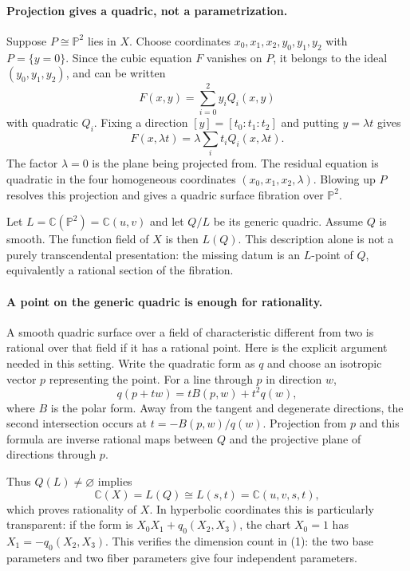\documentclass[11pt]{article}
\begin{document}
\paragraph{Projection gives a quadric, not a parametrization.}
Suppose $P\cong\mathbb P^2$ lies in $X$. Choose coordinates $x_0,x_1,x_2,y_0,y_1,y_2$ with $P=\{y=0\}$. Since the cubic equation $F$ vanishes on $P$, it belongs to the ideal $(y_0,y_1,y_2)$, and can be written
\[
 F(x,y)=\sum_{i=0}^2 y_i Q_i(x,y)
\]
with quadratic $Q_i$. Fixing a direction $[y]=[t_0:t_1:t_2]$ and putting $y=\lambda t$ gives
\[
 F(x,\lambda t)=\lambda\sum_i t_iQ_i(x,\lambda t).
\]
The factor $\lambda=0$ is the plane being projected from. The residual equation is quadratic in the four homogeneous coordinates $(x_0,x_1,x_2,\lambda)$. Blowing up $P$ resolves this projection and gives a quadric surface fibration over $\mathbb P^2$.

Let $L=\mathbb C(\mathbb P^2)=\mathbb C(u,v)$ and let $Q/L$ be its generic quadric. Assume $Q$ is smooth. The function field of $X$ is then $L(Q)$. This description alone is not a purely transcendental presentation: the missing datum is an $L$-point of $Q$, equivalently a rational section of the fibration.

\paragraph{A point on the generic quadric is enough for rationality.}
A smooth quadric surface over a field of characteristic different from two is rational over that field if it has a rational point. Here is the explicit argument needed in this setting. Write the quadratic form as $q$ and choose an isotropic vector $p$ representing the point. For a line through $p$ in direction $w$,
\[
 q(p+tw)=tB(p,w)+t^2q(w),
\]
where $B$ is the polar form. Away from the tangent and degenerate directions, the second intersection occurs at $t=-B(p,w)/q(w)$. Projection from $p$ and this formula are inverse rational maps between $Q$ and the projective plane of directions through $p$.

Thus $Q(L)\ne\varnothing$ implies
\[
 \mathbb C(X)=L(Q)\cong L(s,t)=\mathbb C(u,v,s,t),
                                                               \tag{1}
\]
which proves rationality of $X$. In hyperbolic coordinates this is particularly transparent: if the form is $X_0X_1+q_0(X_2,X_3)$, the chart $X_0=1$ has $X_1=-q_0(X_2,X_3)$. This verifies the dimension count in (1): the two base parameters and two fiber parameters give four independent parameters.
\end{document}
